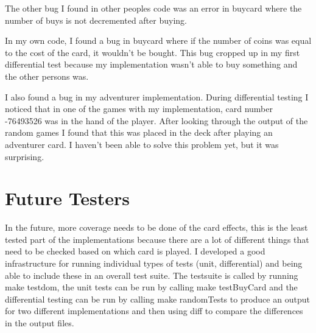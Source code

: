 \documentclass[letterpaper,12pt]{article}
\begin{document}
The other bug I found in other peoples code was an error in buycard where the number of buys is not decremented 
after buying. 

In my own code, I found a bug in buycard where if the number of coins was equal to the cost of the
card, it wouldn't be bought. This bug cropped up in my first differential test because my implementation wasn't
able to buy something and the other persons was.

I also found a bug in my adventurer implementation. During differential testing I noticed that in one of the games
with my implementation, card number -76493526 was in the hand of the player. After looking through the output of
the random games I found that this was placed in the deck after playing an adventurer card. I haven't been able to solve
this problem yet, but it was surprising.

\section{Future Testers}
In the future, more coverage needs to be done of the card effects, this is the least tested part of the implementations because
there are a lot of different things that need to be checked based on which card is played. I developed a good infrastructure
for running individual types of tests (unit, differential) and being able to include these in an overall test suite. The testsuite 
is called by running make testdom, the unit tests can be run by calling make testBuyCard and the differential testing can
be run by calling make randomTests to produce an output for two different implementations and then using diff to compare
the differences in the output files. 
\end{document}
